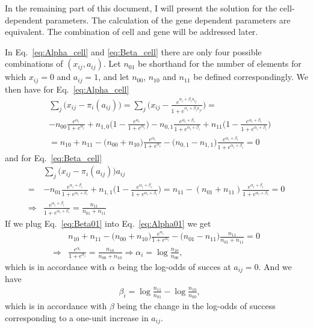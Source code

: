 \documentclass[12pt]{article}
\begin{document}
In the remaining part of this document, I will present the solution for the cell-dependent parameters. 
The calculation of the gene dependent parameters are equivalent. 
The combination of cell and gene will be addressed later. 

In Eq.~\ref{eq:Alpha_cell} and \ref{eq:Beta_cell} there are only four possible combinations of $(x_{ij},a_{ij})$. Let $n_{01}$ be shorthand for the number of elements for which $x_{ij} = 0$ and $a_{ij} = 1$, and let $n_{00}$, $n_{10}$ and $n_{11}$ be defined correspondingly.
We then have for Eq.~\ref{eq:Alpha_cell}
\begin{align} \label{eq:Alpha01}
 &  \sum_{j} \big (x_{ij} -\pi_i(a_{ij}) \big ) = \sum_{j} \big (x_{ij} -  \frac{e^{\alpha_{i} + \beta_{i} a_{ij}}}{1 + e^{\alpha_{i} + \beta_{i} a_{ji}}} \big ) = \nonumber \\
& - n_{00} \frac{e^{\alpha_{i}}}{1 + e^{\alpha_{i}}} + n_{1,0} \big (1 -  \frac{e^{\alpha_{i}}}{1 + e^{\alpha_{i}}} \big ) - n_{0,1}\frac{e^{\alpha_{i} + \beta_{i}}}{1 + e^{\alpha_{i} + \beta_{i}}} + n_{11}\big  (1 - \frac{e^{\alpha_{i} + \beta_{i}}}{1 + e^{\alpha_{i} + \beta_{i}}}\big ) \nonumber \\
& = n_{10} + n_{11} - \big ( n_{00} + n_{10} \big ) \frac{e^{\alpha_{i}}}{1 + e^{\alpha_{i}}} - \big ( n_{0,1} - n_{1,1} \big ) \frac{e^{\alpha_{i} + \beta_{i}}}{1 + e^{\alpha_{i} + \beta_{i}}} = 0  
\end{align}
and for  Eq.~\ref{eq:Beta_cell}
\begin{align}  \label{eq:Beta01}
 & \sum_{j}\big  (x_{ij} - \pi_i(a_{ij}) \big )a_{ij} \nonumber \\
= & -  n_{01} \frac{e^{\alpha_{i} + \beta_{i}}}{1 + e^{\alpha_{i} + \beta_{i}}} + n_{1,1} \big (1 -  \frac{e^{\alpha_{i} + \beta_{i}}}{1 + e^{\alpha_{i} + \beta_{i}}} \big ) 
 =  n_{11} - (n_{01} + n_{11}) \frac{e^{\alpha_{i} + \beta_{i}}}{1 + e^{\alpha_{i} + \beta_{i}}} = 0 \nonumber \\
\Rightarrow & \frac{e^{\alpha_{i} + \beta_{i}}}{1 + e^{\alpha_{i} + \beta_{i}}} = \frac{n_{11}}{n_{01} + n_{11}}
\end{align}
If we plug Eq.~\ref{eq:Beta01} into Eq.~\ref{eq:Alpha01} we get
\begin{align} \label{eq:AnalyticalAlpha}
&   n_{10} + n_{11} - \big ( n_{00} + n_{10} \big ) \frac{e^{\alpha_{i}}}{1 + e^{\alpha_{i}}} - \big ( n_{01} - n_{11} \big ) \frac{n_{11}}{n_{01} + n_{11}} = 0 \nonumber\\
\Rightarrow & \frac{e^{\alpha_{i}}}{1 + e^{\alpha_{i}}} = \frac{n_{10}}{n_{00} + n_{10}} \Rightarrow \alpha_i = \log \frac{n_{10}}{n_{00}},
\end{align}
which is in accordance with $\alpha$ being the log-odds of succes at $a_{ij} = 0$.
And we have 
\begin{align} \label{eq:AnalyticalBeta}
&  \beta_i =  \log \frac{n_{11}}{n_{01}} - \log \frac{n_{10}}{n_{00}},
\end{align} 
which is in accordance with $\beta$ being the change in the log-odds of success corresponding to a one-unit increase in $a_{ij}$.
\end{document}
